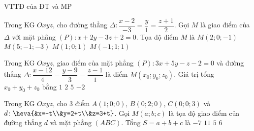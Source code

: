 \begin{dang}{VTTĐ của ĐT và MP}

\end{dang}
\begin{ex}%
Trong KG $Oxyz$, cho đường thẳng $\Delta:\dfrac{x-2}{-3}=\dfrac{y}{1}=\dfrac{z+1}{2}$. Gọi $M$ là giao điểm của $\Delta$ với mặt phẳng $(P): x+2y-3z+2=0$. Tọa độ điểm $M$ là
\choice
{$M(2;0;-1)$}
{$M(5;-1;-3)$}
{$M(1;0;1)$}
{\True $M(-1;1;1)$}
\end{ex}

\begin{ex}%
Trong KG $Oxyz$, giao điểm của mặt phẳng $(P):3x+5y-z-2=0$ và đường thẳng $\Delta:\dfrac{x-12}{4}=\dfrac{y-9}{3}=\dfrac{z-1}{1}$ là điểm $M\left(x_0;y_0;z_0\right)$. Giá trị tổng $x_0+y_0+z_0$ bằng
\choice
{$1$}
{$2$}
{$5$}
{\True $-2$}
\end{ex}

\begin{ex}%
Trong KG $Oxyz$, cho $3$ điểm $A(1;0;0)$, $B(0;2;0)$, $C(0;0;3)$ và $d\colon\heva{&x=-t\\&y=2+t\\&z=3+t}$. Gọi $M(a;b;c)$ là tọa độ giao điểm của đường thẳng $d$ và mặt phẳng $(ABC)$. Tổng $S=a+b+c$ là
\choice
{$-7$}
{\True $11$}
{$5$}
{$6$}
\end{ex}

